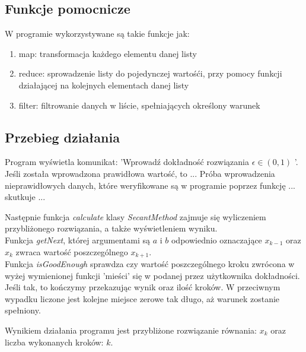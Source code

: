 \documentclass[12pt]{article}
\begin{document}
\subsection{Funkcje pomocnicze}

W programie wykorzystywane są takie funkcje jak:
\begin{enumerate}
\item map: transformacja każdego elementu danej listy 
\item reduce: sprowadzenie listy do pojedynczej wartośći, przy pomocy funkcji działającej na kolejnych elementach danej listy 
\item filter: filtrowanie danych w liście, spełniających określony warunek
\end{enumerate}
\subsection{Przebieg działania}
Program wyświetla komunikat: 'Wprowadź dokładność rozwiązania $\epsilon \in(0,1)$ '. Jeśli została wprowadzona prawidłowa wartość, to ...
Próba wprowadzenia nieprawidłowych danych, które weryfikowane są w programie poprzez funkcję ... skutkuje ...
\par Następnie funkcja \emph{calculate} klasy \emph{SecantMethod} zajmuje się wyliczeniem przybliżonego rozwiązania, a także wyświetleniem wyniku.\\
Funkcja \emph{getNext}, której argumentami są $a$ i $b$ odpowiednio oznaczające $x_{k-1}$ oraz $x_{k}$ zwraca wartość poszczególnego $x_{k+1}$.
\\
Funkcja \emph{isGoodEnough} sprawdza czy wartość poszczególnego kroku zwrócona w wyżej wymienionej funkcji 'mieści' się w podanej przez użytkownika dokładności. Jeśli tak, to kończymy przekazując wynik oraz ilość kroków. W przeciwnym wypadku liczone jest kolejne miejsce zerowe tak długo, aż warunek zostanie spełniony.


Wynikiem działania programu jest przybliżone rozwiązanie równania: $x_k$ oraz liczba wykonanych kroków: $k$.
\newpage
\end{document}
